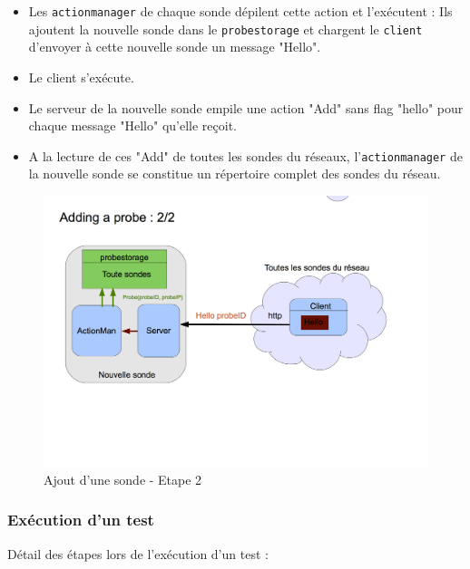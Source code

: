 \documentclass[a4paper,11pt]{article}
\begin{document}
\begin{itemize}
\item Les \texttt{actionmanager} de chaque sonde dépilent cette action et l'exécutent : Ils ajoutent la nouvelle sonde dans le \texttt{probestorage} et chargent le \texttt{client} d'envoyer à cette nouvelle sonde un message "Hello".
\item Le client s'exécute.
\item Le serveur de la nouvelle sonde empile une action "Add" sans flag "hello" pour chaque message "Hello" qu'elle reçoit.
\item A la lecture de ces "Add" de toutes les sondes du réseaux, l'\texttt{actionmanager} de la nouvelle sonde se constitue un répertoire complet des sondes du réseau.
\end{itemize}

\begin{figure}[!ht]
\centering\includegraphics[width=\linewidth]{img/graphAdd2.png}
\caption{Ajout d'une sonde - Etape 2}
\end{figure}

\FloatBarrier



\subsubsection{Exécution d'un test}

Détail des étapes lors de l'exécution d'un test :
\end{document}
